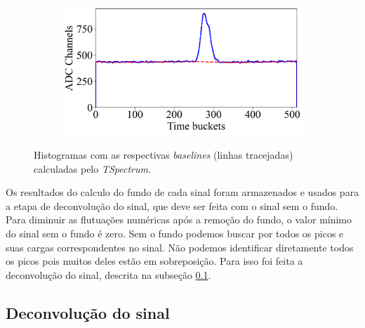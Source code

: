 \documentclass[a4paper,12pt,oneside]{book}
\begin{document}
\begin{figure}[H]
\begin{subfigure}[b]{0.48\textwidth}
        \caption{}
        \label{subfig:ex_sinal_bkg_3}
    \end{subfigure}%
    \hfill
    \begin{subfigure}[b]{0.48\textwidth}
        \centering
        \includegraphics[scale=0.394]{figs/ex_sinal_bkg_4.png}
        \caption{}
        \label{subfig:ex_sinal_bkg_4}
    \end{subfigure}
\caption{Histogramas com as respectivas \textit{baselines} (linhas tracejadas) calculadas pelo \textit{TSpectrum}.}
\label{fig:ex_sinal_bkg}
\end{figure}

\par Os resultados do calculo do fundo de cada sinal foram armazenados e usados para a etapa de deconvolução do sinal, que deve ser feita com o sinal sem o fundo. Para diminuir as flutuações numéricas após a remoção do fundo, o valor mínimo do sinal sem o fundo é zero. Sem o fundo podemos buscar por todos os picos e suas cargas correspondentes no sinal. Não podemos identificar diretamente todos os picos pois muitos deles estão em sobreposição. Para isso foi feita a deconvolução do sinal, descrita na subseção \ref{subsec:pulses_deconv}.



\subsection{Deconvolução do sinal}\label{subsec:pulses_deconv}

\end{document}
